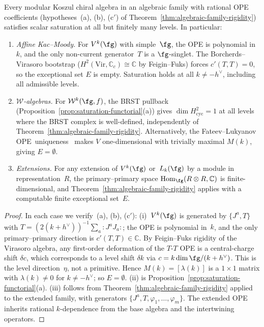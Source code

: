 \begin{corollary}
\label{cor:saturation-algebraic-families}
Every modular Koszul chiral algebra in an algebraic family
with rational OPE coefficients
\textup{(}hypotheses~\textup{(a), (b), (c$'$)} of
Theorem~\textup{\ref{thm:algebraic-family-rigidity}}\textup{)}
satisfies scalar saturation at all but finitely many levels.
In particular:
\begin{enumerate}[label=\textup{(\roman*)}]
\item \emph{Affine Kac--Moody.}  For $V^k(\fg)$ with
  simple~$\fg$, the OPE is polynomial in~$k$, and the
  only non-current generator~$T$ is a $\fg$-singlet.
  The Borcherds--Virasoro bootstrap
  \textup{(}$H^2(\mathrm{Vir}, \mathbb{C}_c) \cong
  \mathbb{C}$ by Feigin--Fuks\textup{)} forces
  $c'(T,T) = 0$, so the exceptional set $E$ is empty.
  Saturation holds at all $k \neq -h^\vee$, including
  all admissible levels.
\item \emph{$\mathcal{W}$-algebras.}
  For $\mathcal{W}^k(\fg,f)$, the BRST pullback
  \textup{(}Proposition~\textup{\ref{prop:saturation-functorial}(a)}\textup{)}
  gives $\dim H^2_{\mathrm{cyc}} = 1$ at all levels where
  the BRST complex is well-defined, independently of
  Theorem~\textup{\ref{thm:algebraic-family-rigidity}}.
  Alternatively, the Fateev--Lukyanov
  OPE~uniqueness~\textup{\cite{FL88}} makes $V$ one-dimensional
  with trivially maximal $M(k)$, giving $E = \emptyset$.
\item \emph{Extensions.}  For any extension of $V^k(\fg)$
  or~$L_k(\fg)$ by a module in representation~$R$, the
  primary--primary space $\operatorname{Hom}_\fg(R \otimes R, \mathbb{C})$ is
  finite-dimensional, and
  Theorem~\textup{\ref{thm:algebraic-family-rigidity}} applies
  with a computable finite exceptional set~$E$.
\end{enumerate}
\end{corollary}

\begin{proof}
In each case we verify~(a), (b), (c$'$):
(i)~$V^k(\fg)$ is generated by $\{J^a, T\}$ with
$T = (2(k+h^\vee))^{-1} \sum_a {:}J^a J_a{:}$;
the OPE is polynomial in~$k$, and the only primary--primary
direction is $c'(T,T) \in \mathbb{C}$.  By Feigin--Fuks rigidity
of the Virasoro algebra, any first-order deformation of the
$T$-$T$ OPE is a central-charge shift $\delta c$, which
corresponds to a level shift $\delta k$ via
$c = k\dim\fg/(k+h^\vee)$.  This is the level
direction~$\eta$, not a primitive.  Hence
$M(k) = [\lambda(k)]$ is a $1 \times 1$ matrix with
$\lambda(k) \neq 0$ for $k \neq -h^\vee$; so
$E = \emptyset$.
(ii) is
Proposition~\ref{prop:saturation-functorial}(a).
(iii) follows from
Theorem~\ref{thm:algebraic-family-rigidity} applied to
the extended family, with generators
$\{J^a, T, \varphi_1, \ldots, \varphi_m\}$.
The extended OPE inherits rational $k$-dependence
from the base algebra and the intertwining operators.
\end{proof}

